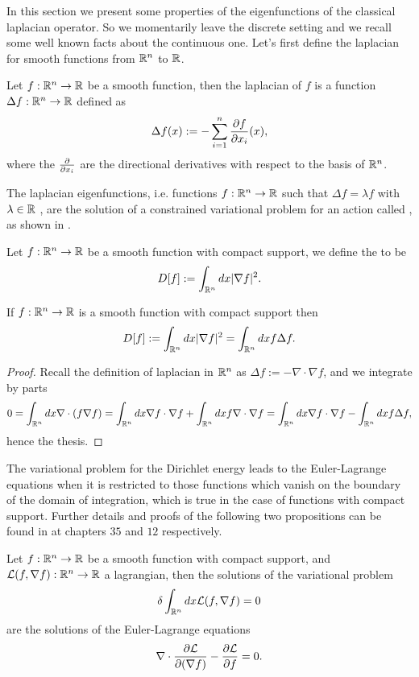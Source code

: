 \documentclass[../2.tex]{subfiles}
\begin{document}
In this section we present some properties of the eigenfunctions of the classical laplacian operator.
So we momentarily leave the discrete setting and we recall some well known facts about the continuous one.
Let's first define the laplacian for smooth functions from $\mathbb{R}^n$ to $\mathbb{R}$. 

\begin{defn}
    Let $f : \mathbb{R}^n \to \mathbb{R}$ be a smooth function, then the laplacian of $f$ is a function $\Delta f : \mathbb{R}^n \to \mathbb{R}$ defined as
    \[ \Delta f(x) := - \sum_{i=1}^n \frac{\partial f}{\partial x_i}(x), \]
    where the $\frac{\partial}{\partial x_i}$ are the directional derivatives with respect to the basis of $\mathbb{R}^n$.
\end{defn}

The laplacian eigenfunctions, i.e. functions $f: \mathbb{R}^n \to \mathbb{R}$ such that $\Delta f = \lambda f$ with $\lambda \in \mathbb{R}$ , are the solution of a constrained variational problem for an action called , as shown in \cite{bronstein}.

\begin{defn}
    Let $f:\mathbb{R}^n \to \mathbb{R}$ be a smooth function with compact support, we define the  to be
    \[ D[f] := \int_{\mathbb{R}^n} dx |\nabla f|^2 .\]
\end{defn}

\begin{prop}
    If $f:\mathbb{R}^n \to\mathbb{R}$ is a smooth function with compact support then 
    \[ D[f] := \int_{\mathbb{R}^n} dx |\nabla f|^2 = \int_{\mathbb{R}^n} dx f\Delta f .\]
    \label{prop:2:4:3}
\end{prop}
\begin{proof}
    Recall the definition of laplacian in $\mathbb{R}^n$ as $\Delta f := -\nabla \cdot \nabla f$, and we integrate by parts
    \[ 0 = \int_{\mathbb{R}^n} dx \nabla \cdot (f \nabla f) = \int_{\mathbb{R}^n} dx \nabla f \cdot \nabla f + \int_{\mathbb{R}^n} dx f \nabla \cdot \nabla f = \int_{\mathbb{R}^n} dx \nabla f \cdot \nabla f - \int_{\mathbb{R}^n} dx f \Delta f, \]
    hence the thesis. \qedhere
\end{proof}

The variational problem for the Dirichlet energy leads to the Euler-Lagrange equations when it is restricted to those functions which
vanish on the boundary of the domain of integration, which is true in the case of functions with compact support.
Further details and proofs of the following two propositions can be found in \cite{fomin} at chapters $35$ and $12$ respectively.

\begin{prop}
    Let $f:\mathbb{R}^n \to \mathbb{R}$ be a smooth function with compact support, and $\mathcal{L}(f,\nabla f) : \mathbb{R}^n \to \mathbb{R}$ a lagrangian,
    then the solutions of the variational problem 
    \[ \delta\int_{\mathbb{R}^n} dx \mathcal{L}(f,\nabla f) = 0 \]
    are the solutions of the Euler-Lagrange equations
    \[ \nabla \cdot \frac{\partial \mathcal{L}}{\partial(\nabla f)} - \frac{\partial\mathcal{L}}{\partial f} = 0. \]
\end{prop}
\end{document}
